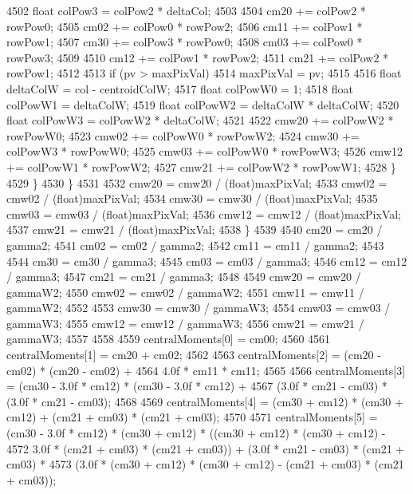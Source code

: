 \begin{DoxyCode}
4502           \textcolor{keywordtype}{float}  colPow3 = colPow2  * deltaCol;
4503 
4504           cm20 += colPow2 * rowPow0;
4505           cm02 += colPow0 * rowPow2;
4506           cm11 += colPow1 * rowPow1;
4507           cm30 += colPow3 * rowPow0;
4508           cm03 += colPow0 * rowPow3;
4509 
4510           cm12 += colPow1 * rowPow2;
4511           cm21 += colPow2 * rowPow1;
4512 
4513           \textcolor{keywordflow}{if}  (pv > maxPixVal)
4514             maxPixVal = pv;
4515 
4516           \textcolor{keywordtype}{float}  deltaColW = col - centroidColW;
4517           \textcolor{keywordtype}{float}  colPowW0 = 1;
4518           \textcolor{keywordtype}{float}  colPowW1 = deltaColW;
4519           \textcolor{keywordtype}{float}  colPowW2 = deltaColW * deltaColW;
4520           \textcolor{keywordtype}{float}  colPowW3 = colPowW2  * deltaColW;
4521 
4522           cmw20 += colPowW2 * rowPowW0;
4523           cmw02 += colPowW0 * rowPowW2;
4524           cmw30 += colPowW3 * rowPowW0;
4525           cmw03 += colPowW0 * rowPowW3;
4526           cmw12 += colPowW1 * rowPowW2;
4527           cmw21 += colPowW2 * rowPowW1;
4528         \}
4529       \}
4530     \}
4531 
4532     cmw20 = cmw20 / (float)maxPixVal;
4533     cmw02 = cmw02 / (float)maxPixVal;
4534     cmw30 = cmw30 / (float)maxPixVal;
4535     cmw03 = cmw03 / (float)maxPixVal;
4536     cmw12 = cmw12 / (float)maxPixVal;
4537     cmw21 = cmw21 / (float)maxPixVal;
4538   \}
4539 
4540   cm20  = cm20  / gamma2;
4541   cm02  = cm02  / gamma2;
4542   cm11  = cm11  / gamma2;
4543 
4544   cm30  = cm30  / gamma3;
4545   cm03  = cm03  / gamma3;
4546   cm12  = cm12  / gamma3;
4547   cm21  = cm21  / gamma3;
4548 
4549   cmw20 = cmw20 / gammaW2;
4550   cmw02 = cmw02 / gammaW2;
4551   cmw11 = cmw11 / gammaW2;
4552 
4553   cmw30 = cmw30 / gammaW3;
4554   cmw03 = cmw03 / gammaW3;
4555   cmw12 = cmw12 / gammaW3;
4556   cmw21 = cmw21 / gammaW3;
4557 
4558 
4559   centralMoments[0] = cm00;
4560 
4561   centralMoments[1] = cm20 + cm02;
4562  
4563   centralMoments[2] = (cm20 - cm02) * (cm20 - cm02) + 
4564                 4.0f * cm11 * cm11;
4565 
4566   centralMoments[3] = (cm30 - 3.0f * cm12) * (cm30 - 3.0f * cm12) + 
4567                 (3.0f * cm21 - cm03) * (3.0f * cm21 - cm03);
4568 
4569   centralMoments[4] = (cm30 + cm12) * (cm30 + cm12) + (cm21 + cm03) * (cm21 + cm03);
4570 
4571   centralMoments[5] = (cm30 - 3.0f * cm12) * (cm30 + cm12) * ((cm30 + cm12) * (cm30 + cm12) - 
4572                 3.0f * (cm21 + cm03) * (cm21 + cm03))  +  (3.0f * cm21 - cm03) * (cm21 + cm03) * 
4573                 (3.0f * (cm30 + cm12) * (cm30 + cm12) - (cm21 + cm03) * (cm21 + cm03));

\end{DoxyCode}
